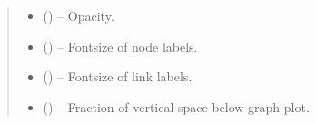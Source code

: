 \documentclass[letterpaper,10pt,english]{sphinxmanual}
\begin{document}
\begin{fulllineitems}
\begin{quote}
\begin{description}
\begin{itemize}
\item {} 
 (\sphinxstyleliteralemphasis{, }\sphinxstyleliteralemphasis{ (}\sphinxstyleliteralemphasis{)}\sphinxstyleliteralemphasis{}) -- Opacity.

\item {} 
 (\sphinxstyleliteralemphasis{, }\sphinxstyleliteralemphasis{ (}\sphinxstyleliteralemphasis{)}\sphinxstyleliteralemphasis{}) -- Fontsize of node labels.

\item {} 
 (\sphinxstyleliteralemphasis{, }\sphinxstyleliteralemphasis{ (}\sphinxstyleliteralemphasis{)}\sphinxstyleliteralemphasis{}) -- Fontsize of link labels.

\item {} 
 (\sphinxstyleliteralemphasis{, }\sphinxstyleliteralemphasis{ (}\sphinxstyleliteralemphasis{)}\sphinxstyleliteralemphasis{}) -- Fraction of vertical space below graph plot.

\end{itemize}

\end{description}\end{quote}

\end{fulllineitems}

\end{document}

